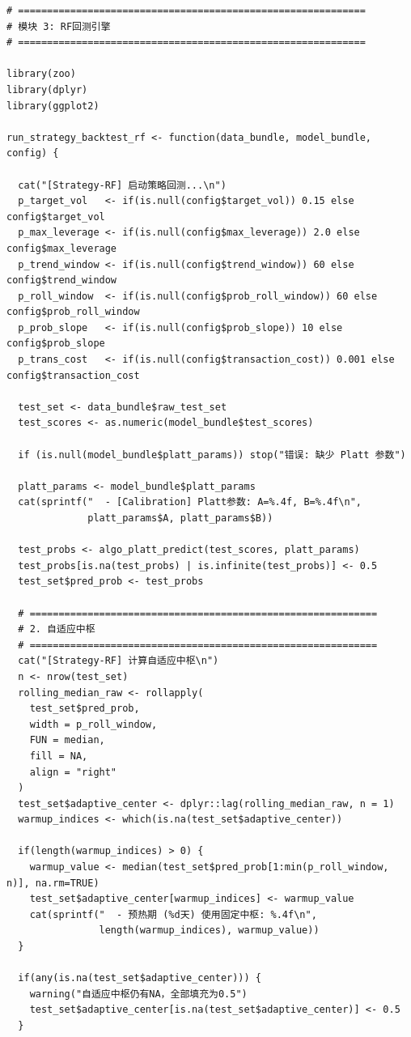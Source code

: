 \documentclass[11pt, a4paper]{article}
\begin{document}
\begin{verbatim}
# ============================================================
# 模块 3: RF回测引擎
# ============================================================

library(zoo)
library(dplyr)
library(ggplot2)

run_strategy_backtest_rf <- function(data_bundle, model_bundle, config) {
  
  cat("[Strategy-RF] 启动策略回测...\n")
  p_target_vol   <- if(is.null(config$target_vol)) 0.15 else config$target_vol
  p_max_leverage <- if(is.null(config$max_leverage)) 2.0 else config$max_leverage
  p_trend_window <- if(is.null(config$trend_window)) 60 else config$trend_window
  p_roll_window  <- if(is.null(config$prob_roll_window)) 60 else config$prob_roll_window
  p_prob_slope   <- if(is.null(config$prob_slope)) 10 else config$prob_slope
  p_trans_cost   <- if(is.null(config$transaction_cost)) 0.001 else config$transaction_cost
  
  test_set <- data_bundle$raw_test_set
  test_scores <- as.numeric(model_bundle$test_scores)
  
  if (is.null(model_bundle$platt_params)) stop("错误: 缺少 Platt 参数")
  
  platt_params <- model_bundle$platt_params
  cat(sprintf("  - [Calibration] Platt参数: A=%.4f, B=%.4f\n", 
              platt_params$A, platt_params$B))
  
  test_probs <- algo_platt_predict(test_scores, platt_params)
  test_probs[is.na(test_probs) | is.infinite(test_probs)] <- 0.5
  test_set$pred_prob <- test_probs
  
  # ============================================================
  # 2. 自适应中枢
  # ============================================================
  cat("[Strategy-RF] 计算自适应中枢\n")
  n <- nrow(test_set)
  rolling_median_raw <- rollapply(
    test_set$pred_prob, 
    width = p_roll_window, 
    FUN = median, 
    fill = NA, 
    align = "right"
  )
  test_set$adaptive_center <- dplyr::lag(rolling_median_raw, n = 1)
  warmup_indices <- which(is.na(test_set$adaptive_center))
  
  if(length(warmup_indices) > 0) {
    warmup_value <- median(test_set$pred_prob[1:min(p_roll_window, n)], na.rm=TRUE)
    test_set$adaptive_center[warmup_indices] <- warmup_value
    cat(sprintf("  - 预热期 (%d天) 使用固定中枢: %.4f\n", 
                length(warmup_indices), warmup_value))
  }
  
  if(any(is.na(test_set$adaptive_center))) {
    warning("自适应中枢仍有NA，全部填充为0.5")
    test_set$adaptive_center[is.na(test_set$adaptive_center)] <- 0.5
  }
  

\end{verbatim}
\end{document}

